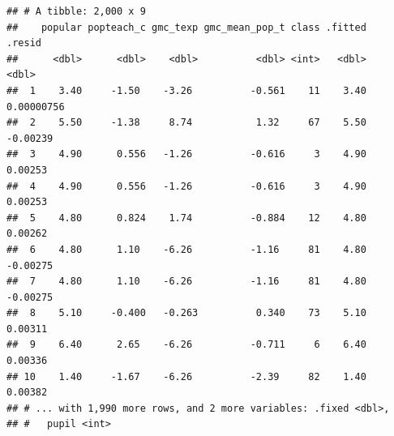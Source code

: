 \documentclass[]{article}
\newenvironment{Shaded}{\begin{snugshade}}{\end{snugshade}}
\newcommand{\KeywordTok}[1]{\textcolor[rgb]{0.13,0.29,0.53}{\textbf{#1}}}
\newcommand{\DataTypeTok}[1]{\textcolor[rgb]{0.13,0.29,0.53}{#1}}
\newcommand{\DecValTok}[1]{\textcolor[rgb]{0.00,0.00,0.81}{#1}}
\newcommand{\StringTok}[1]{\textcolor[rgb]{0.31,0.60,0.02}{#1}}
\newcommand{\OperatorTok}[1]{\textcolor[rgb]{0.81,0.36,0.00}{\textbf{#1}}}
\newcommand{\NormalTok}[1]{#1}
\begin{document}
\begin{Shaded}
\end{Shaded}

\begin{verbatim}
## # A tibble: 2,000 x 9
##    popular popteach_c gmc_texp gmc_mean_pop_t class .fitted      .resid
##      <dbl>      <dbl>    <dbl>          <dbl> <int>   <dbl>       <dbl>
##  1    3.40     -1.50    -3.26          -0.561    11    3.40  0.00000756
##  2    5.50     -1.38     8.74           1.32     67    5.50 -0.00239   
##  3    4.90      0.556   -1.26          -0.616     3    4.90  0.00253   
##  4    4.90      0.556   -1.26          -0.616     3    4.90  0.00253   
##  5    4.80      0.824    1.74          -0.884    12    4.80  0.00262   
##  6    4.80      1.10    -6.26          -1.16     81    4.80 -0.00275   
##  7    4.80      1.10    -6.26          -1.16     81    4.80 -0.00275   
##  8    5.10     -0.400   -0.263          0.340    73    5.10  0.00311   
##  9    6.40      2.65    -6.26          -0.711     6    6.40  0.00336   
## 10    1.40     -1.67    -6.26          -2.39     82    1.40  0.00382   
## # ... with 1,990 more rows, and 2 more variables: .fixed <dbl>,
## #   pupil <int>
\end{verbatim}

\begin{Shaded}
\end{Shaded}
\end{document}
